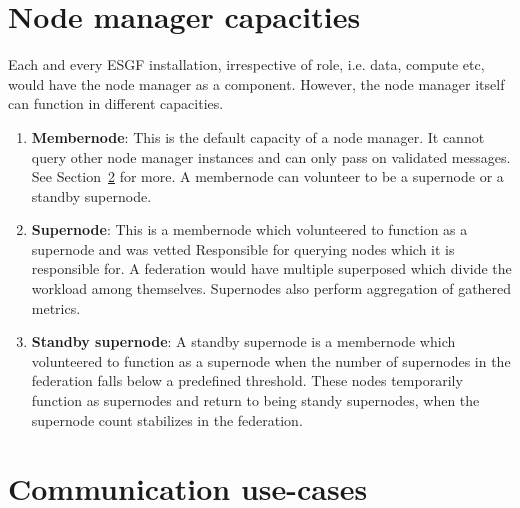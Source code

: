 \documentclass[oneside,12pt]{memoir}
\begin{document}
\section{Node manager capacities}
Each and every ESGF installation, irrespective of role, i.e. data, compute etc, would have the node manager as a component.  However, the node manager itself can function in different capacities. 
\begin{enumerate}
\item \textbf{Membernode}: This is the default capacity of a node manager. It cannot query other node manager instances and can only pass on validated messages. See Section~\ref{commcases} for more. A membernode can volunteer to be a supernode or a standby supernode.
\item \textbf{Supernode}: This is a membernode which volunteered to function as a supernode and was vetted Responsible for querying nodes which it is responsible for.  A federation would have multiple superposed which divide the workload among themselves. Supernodes also perform aggregation of gathered metrics. 
\item \textbf{Standby supernode}: A standby supernode is a membernode which volunteered to function as a supernode when the number of supernodes in the federation falls below a predefined threshold. These nodes temporarily function as supernodes and return to being standy supernodes, when the supernode count stabilizes in the federation.
\end{enumerate}

\section{Communication use-cases}
\label{commcases}
\end{document}
